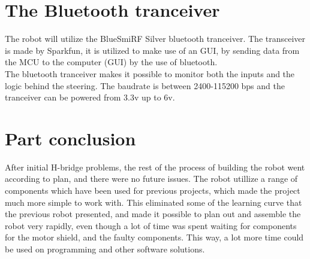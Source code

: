 \section{The Bluetooth tranceiver}
The robot will utilize the BlueSmiRF Silver bluetooth tranceiver. The transceiver is made by Sparkfun, it is utilized to make use of an GUI, by sending data from the MCU to the computer (GUI) by the use of bluetooth.\\ The bluetooth tranceiver makes it possible to monitor both the inputs and the logic behind the steering. The baudrate is between 2400-115200 bps and the tranceiver can be powered from 3.3v up to 6v. 

\section{Part conclusion}
After initial H-bridge problems, the rest of the process of building the robot went according to plan, and there were no future issues. The robot utillize a range of components which have been used for previous projects, which made the project much more simple to work with. This eliminated some of the learning curve that the previous robot presented, and made it possible to plan out and assemble the robot very rapidly, even though a lot of time was spent waiting for components for the motor shield, and the faulty components. This way, a lot more time could be used on programming and other software solutions. 
